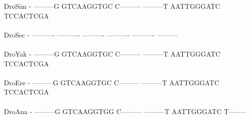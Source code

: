 \documentclass[11pt,twoside,reqno,a4paper]{article}
\begin{document}
{DroSim	-	---------G	GTCAAGGTGC	C---------	---------T	AATTGGGATC	TCCACTCGA\\
\hspace*{7\charwidth}\hspace*{1\charwidth}\hspace*{1\charwidth}\hspace*{1\charwidth}\hspace*{1\charwidth}\hspace*{1\charwidth}\hspace*{1\charwidth}\\
DroSec	-	----------	----------	----------	----------	----------	---------\\
\hspace*{7\charwidth}\hspace*{1\charwidth}\hspace*{1\charwidth}\hspace*{1\charwidth}\hspace*{1\charwidth}\hspace*{1\charwidth}\hspace*{1\charwidth}\\
DroYak	-	---------G	GTCAAGGTGC	C---------	---------T	AATTGGGATC	TCCACTCGA\\
\hspace*{7\charwidth}\hspace*{1\charwidth}\hspace*{1\charwidth}\hspace*{1\charwidth}\hspace*{1\charwidth}\hspace*{1\charwidth}\hspace*{1\charwidth}\\
DroEre	-	---------G	GTCAAGGTGC	C---------	---------T	AATTGGGATC	TCCACTCGA\\
\hspace*{7\charwidth}\hspace*{1\charwidth}\hspace*{1\charwidth}\hspace*{1\charwidth}\hspace*{1\charwidth}\hspace*{1\charwidth}\hspace*{1\charwidth}\\
DroAna	-	---------G	GTCAAGGTGG	C---------	---------T	AATTGGGATC	T--------\\
\hspace*{7\charwidth}\hspace*{1\charwidth}\hspace*{1\charwidth}\hspace*{1\charwidth}\hspace*{1\charwidth}\hspace*{1\charwidth}\hspace*{1\charwidth}\\
}
\end{document}
